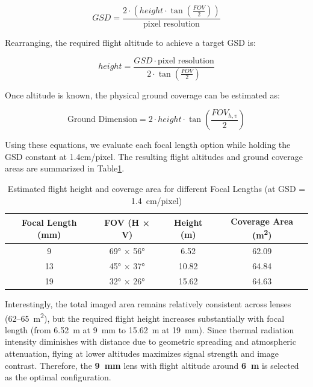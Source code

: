 \begin{equation}
GSD = \frac{2 \cdot (height \cdot \tan(\frac{FOV}{2}))}{\text{pixel resolution}}
\end{equation}

Rearranging, the required flight altitude to achieve a target GSD is:

\begin{equation}
height = \frac{GSD \cdot \text{pixel resolution}}{2 \cdot \tan(\frac{FOV}{2})}
\end{equation}

Once altitude is known, the physical ground coverage can be estimated as:

\begin{equation}
\text{Ground Dimension} = 2 \cdot height \cdot \tan\left(\frac{FOV_{h,v}}{2}\right)
\end{equation}

Using these equations, we evaluate each focal length option while holding the GSD constant at 1.4cm/pixel. The resulting flight altitudes and ground coverage areas are summarized in Table\ref{tab:fov_results}.

\begin{table}[H]
\centering
\caption{Estimated flight height and coverage area for different Focal Lengths (at GSD = 1.4~cm/pixel)}
\label{tab:fov_results}
\begin{tabular}{|c|c|c|c|}
\hline
\textbf{Focal Length (mm)} & \textbf{FOV (H × V)} & \textbf{Height (m)} & \textbf{Coverage Area (m\textsuperscript{2})} \\
\hline
9  & 69° × 56° & 6.52   & 62.09  \\
\hline
13 & 45° × 37° & 10.82  & 64.84  \\
\hline
19 & 32° × 26° & 15.62  & 64.63  \\
\hline
\end{tabular}
\end{table}

Interestingly, the total imaged area remains relatively consistent across lenses (62–65~m\textsuperscript{2}), but the required flight height increases substantially with focal length (from 6.52~m at 9~mm to 15.62~m at 19~mm). Since thermal radiation intensity diminishes with distance due to geometric spreading and atmospheric attenuation, flying at lower altitudes maximizes signal strength and image contrast. Therefore, the \textbf{9~mm} lens with flight altitude around \textbf{6~m} is selected as the optimal configuration.
